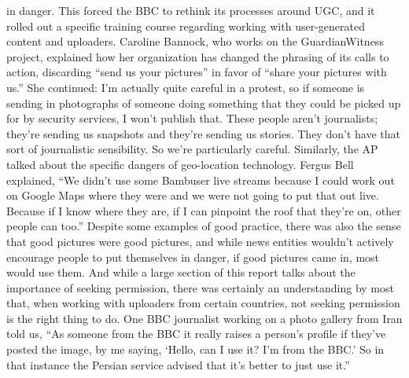 \begin{enumerate}
in danger. This forced the BBC to rethink its processes around UGC, and it
rolled out a specific training course regarding working with user-generated
content and uploaders.
Caroline Bannock, who works on the GuardianWitness project, explained
how her organization has changed the phrasing of its calls to action, discarding
``send us your pictures'' in favor of ``share your pictures with us.''
She continued:
I'm actually quite careful in a protest, so if someone is sending in
photographs of someone doing something that they could be picked
up for by security services, I won't publish that. These people aren't
journalists; they're sending us snapshots and they're sending us stories.
They don't have that sort of journalistic sensibility. So we're
particularly careful.
Similarly, the AP talked about the specific dangers of geo-location technology.
Fergus Bell explained, ``We didn't use some Bambuser live streams
because I could work out on Google Maps where they were and we were not
going to put that out live. Because if I know where they are, if I can pinpoint
the roof that they're on, other people can too.'' Despite some examples of
good practice, there was also the sense that good pictures were good pictures,
and while news entities wouldn't actively encourage people to put
themselves in danger, if good pictures came in, most would use them.
And while a large section of this report talks about the importance of seeking
permission, there was certainly an understanding by most that, when
working with uploaders from certain countries, not seeking permission is
the right thing to do. One BBC journalist working on a photo gallery from
Iran told us, ``As someone from the BBC it really raises a person's profile if
they've posted the image, by me saying, ‘Hello, can I use it? I'm from the
BBC.' So in that instance the Persian service advised that it's better to just
use it.''


\end{enumerate}

